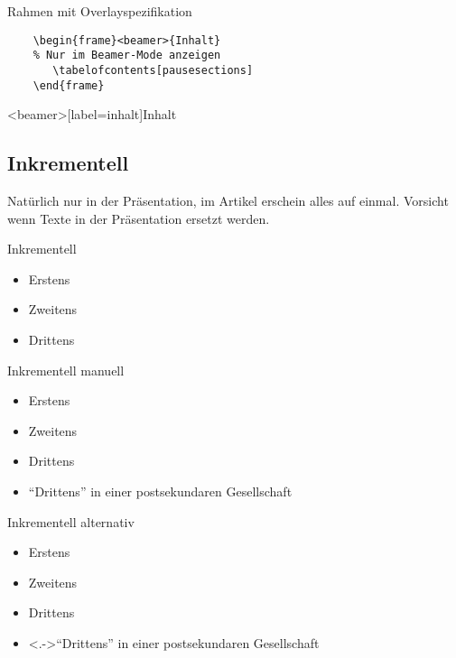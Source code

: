 \documentclass{beamer}
\begin{document}
\begin{frame}[label=rahmen2,fragile]{Rahmen mit Overlayspezifikation}
  \begin{verbatim}
    \begin{frame}<beamer>{Inhalt}
    % Nur im Beamer-Mode anzeigen 
       \tabelofcontents[pausesections]
    \end{frame}
  \end{verbatim}
\end{frame}

\begin{frame}<beamer>[label=inhalt]{Inhalt}
    \tableofcontents[pausesections]
\end{frame}

\subsection{Inkrementell}

Natürlich nur in der Präsentation, im Artikel erschein alles auf einmal.
Vorsicht wenn Texte in der Präsentation ersetzt werden.

\begin{frame}[label=inkrementell1]{Inkrementell}
  \begin{itemize}[<+->]
    \item Erstens
    \item Zweitens
    \item Drittens
  \end{itemize}
\end{frame}

\begin{frame}[label=inkrementell2]{Inkrementell manuell}
  \begin{itemize}
    \item <1->Erstens
    \item <2->Zweitens
    \item <3->Drittens
    \item <3->"`Drittens"' in einer postsekundaren Gesellschaft
  \end{itemize}
\end{frame}

\begin{frame}[label=inkrementell3]{Inkrementell alternativ}
  \begin{itemize}[<+->]
    \item Erstens
    \item Zweitens
    \item Drittens
    \item <.->"`Drittens"' in einer postsekundaren Gesellschaft
  \end{itemize}
\end{frame}
\end{document}
